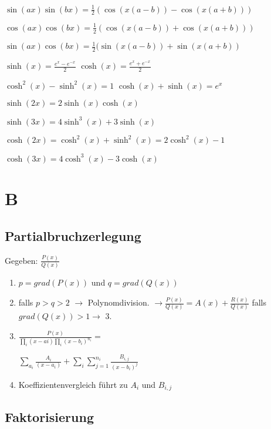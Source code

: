\documentclass[10pt,a4paper]{scrartcl}
\begin{document}
\begin{multicols*}{3}
	 
	
	$\sin(ax)\sin(bx)=\frac{1}{2} (\cos(x(a-b))-\cos(x(a+b)))$
	
	$\cos(ax)\cos(bx)=\frac{1}{2} (\cos(x(a-b))+\cos(x(a+b)))$
	
	$\sin(ax)\cos(bx)=\frac{1}{2} (\sin(x(a-b))+\sin(x(a+b))$
	
	 
	
	$\sinh(x)=\frac{e^x-e^{-x}}{2}$ \hfill $\cosh(x)=\frac{e^x+e^{-x}}{2}$
	
	$\cosh^2(x)-\sinh^2(x)=1$ \hfill $\cosh(x)+\sinh(x)=e^x$
	
	$\sinh(2x)=2\sinh(x)\cosh(x)$
	
	$\sinh(3x)=4\sinh^3(x)+3\sinh(x)$
	
	$\cosh(2x)=\cosh^2(x)+\sinh^2(x)=2\cosh^2(x)-1$
	
	$\cosh(3x)=4\cosh^3(x)-3\cosh(x)$
	
	 
	
	
	
	
	\section{B}
	\subsection{Partialbruchzerlegung}

	Gegeben: $\frac{P(x)}{Q(x)}$
	\begin{enumerate}
	\item
	$p=grad(P(x))$ und $q=grad(Q(x))$ 
	
	\item
	falls $p>q>2$ $\rightarrow$ Polynomdivision. $\rightarrow \frac{P(x)}{Q(x)}= A(x)+\frac{R(x)}{Q(x)}$ falls $grad(Q(x))>1\rightarrow$ 3.
	
	\item
	$\frac{P(x)}{\prod_{i}{(x-ai)}\prod_{i}{(x-b_i)^{n_i}}}=$

	 
	
	$\sum_{a_i}{\frac{A_i}{(x-a_i)}}+\sum_{i}{\sum_{j = 1}^{n_i}{\frac{B_{i,j}}{(x-b_i)^{j}}}}$
	
	\item
	Koeffizientenvergleich führt zu $A_i$ und $B_{i,j}$
	\end{enumerate}
	
	 
	
	\subsection{Faktorisierung}
	

\end{multicols*}
\end{document}

